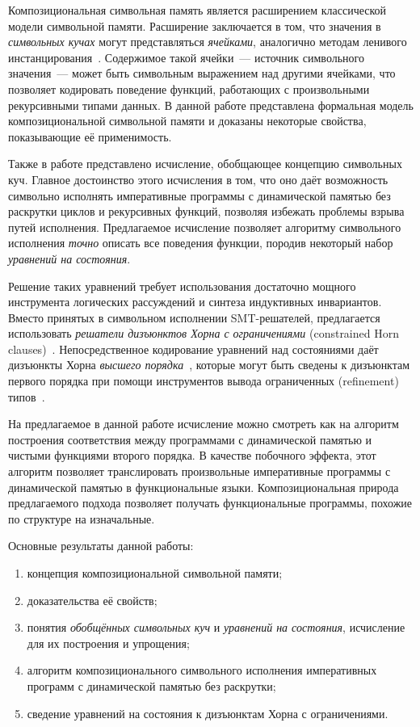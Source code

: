 Композициональная символьная память является расширением классической модели символьной памяти. Расширение заключается в том, что значения в \emph{символьных кучах} могут представляться  \emph{ячейками}, аналогично методам ленивого инстанцирования~\cite{khurshid2003generalized}. Содержимое такой ячейки~--- источник символьного значения~--- может быть символьным выражением над другими ячейками, что позволяет кодировать поведение функций, работающих с произвольными рекурсивными типами данных. В данной работе представлена формальная модель композициональной символьной памяти и доказаны некоторые свойства, показывающие её применимость.

Также в работе представлено исчисление, обобщающее концепцию символьных куч. Главное достоинство этого исчисления в том, что оно даёт возможность символьно исполнять императивные программы с динамической памятью без раскрутки циклов и рекурсивных функций, позволяя избежать проблемы взрыва путей исполнения. Предлагаемое исчисление позволяет алгоритму символьного исполнения \emph{точно} описать все поведения функции, породив некоторый набор \emph{уравнений на состояния}.

Решение таких уравнений требует использования достаточно мощного инструмента логических рассуждений и синтеза индуктивных инвариантов. Вместо принятых в символьном исполнении SMT-решателей, предлагается использовать \emph{решатели дизъюнктов Хорна с ограничениями} (constrained Horn clauses)~\cite{bjorner2015horn}. Непосредственное кодирование уравнений над состояниями даёт дизъюнкты Хорна \emph{высшего порядка}~\cite{cathcart2017higher}, которые могут быть сведены к дизъюнктам первого порядка при помощи инструментов вывода ограниченных (refinement) типов~\cite{vazou2015bounded,unno2013automating,zhu2013compositional}.

На предлагаемое в данной работе исчисление можно смотреть как на алгоритм построения соответствия между программами с динамической памятью и чистыми функциями второго порядка. В качестве побочного эффекта, этот алгоритм позволяет транслировать произвольные императивные программы с динамической памятью в функциональные языки. Композициональная природа предлагаемого подхода позволяет получать функциональные программы, похожие по структуре на изначальные.

Основные результаты данной работы:
\begin{enumerate}
    \item концепция композициональной символьной памяти;
    \item доказательства её свойств;
    \item понятия \emph{обобщённых символьных куч} и \emph{уравнений на состояния}, исчисление для их построения и упрощения;
    \item алгоритм композиционального символьного исполнения императивных программ с динамической памятью без раскрутки;
    \item сведение уравнений на состояния к дизъюнктам Хорна с ограничениями.
\end{enumerate}
